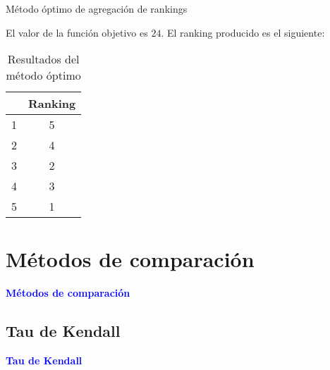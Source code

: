 \documentclass[10pt]{beamer}
\begin{document}
	\begin{frame}{Método óptimo de agregación de rankings}
		\begin{ejemplo}[continuación]
			
			El valor de la función objetivo es $24$. El ranking producido es el siguiente:
			
			\begin{table}[h]
				\centering
				\caption{Resultados del método óptimo}
				\label{tbl:optimo_resultados}
				\begin{tabular}{@{}cc@{}}
					\cmidrule(l){2-2}
					& Ranking \\ \midrule
					1 & 5       \\
					2 & 4       \\
					3 & 2       \\
					4 & 3       \\
					5 & 1       \\ \bottomrule
				\end{tabular}
			\end{table}
			
			
		\end{ejemplo}
	\end{frame}
	
	\section{Métodos de comparación}
	
	\begin{frame}
		\begin{center}
			\Huge\textbf{\textsf{\textcolor{blue}{Métodos de comparación}}}
		\end{center}
	\end{frame}
	
	\subsection{Tau de Kendall}
	
	\begin{frame}
		\begin{center}
			\Huge\textbf{\textsf{\textcolor{blue}{Tau de Kendall}}}
		\end{center}
	\end{frame}
	
\end{document}
